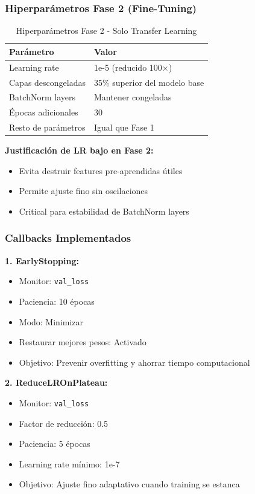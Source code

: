 \documentclass[11pt, a4paper]{article}
\begin{document}
\subsubsection{Hiperparámetros Fase 2 (Fine-Tuning)}

\begin{table}[H]
\centering
\caption{Hiperparámetros Fase 2 - Solo Transfer Learning}
\label{tab:hyperparams_phase2}
\begin{tabular}{@{}ll@{}}
\toprule
\textbf{Parámetro} & \textbf{Valor} \\
\midrule
Learning rate            & 1e-5 (reducido 100×) \\
Capas descongeladas      & 35\% superior del modelo base \\
BatchNorm layers         & Mantener congeladas \\
Épocas adicionales       & 30 \\
Resto de parámetros      & Igual que Fase 1 \\
\bottomrule
\end{tabular}
\end{table}

\textbf{Justificación de LR bajo en Fase 2:}
\begin{itemize}
    \item Evita destruir features pre-aprendidas útiles
    \item Permite ajuste fino sin oscilaciones
    \item Critical para estabilidad de BatchNorm layers
\end{itemize}

\subsubsection{Callbacks Implementados}

\textbf{1. EarlyStopping:}
\begin{itemize}
    \item Monitor: \texttt{val\_loss}
    \item Paciencia: 10 épocas
    \item Modo: Minimizar
    \item Restaurar mejores pesos: Activado
    \item Objetivo: Prevenir overfitting y ahorrar tiempo computacional
\end{itemize}

\textbf{2. ReduceLROnPlateau:}
\begin{itemize}
    \item Monitor: \texttt{val\_loss}
    \item Factor de reducción: 0.5
    \item Paciencia: 5 épocas
    \item Learning rate mínimo: 1e-7
    \item Objetivo: Ajuste fino adaptativo cuando training se estanca
\end{itemize}
\end{document}
